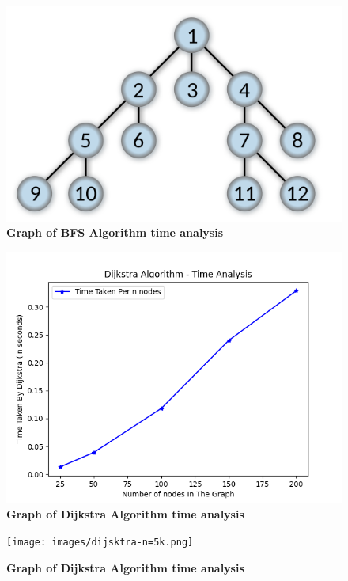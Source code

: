 \documentclass[a4paper, 12pt]{report}
\begin{document}
    
    \begin{figure}
          \centering
          \includegraphics[width=12cm]{images/BFS.png}
          \caption{\textbf{Graph of BFS Algorithm time analysis}}   
          \label{fig:picture1}
    \end{figure} 
    \begin{figure}
          \centering
          \includegraphics[width=12cm]{images/dijkstra2.png}
          \caption{\textbf{Graph of Dijkstra Algorithm time analysis}}   
          \label{fig:picture2}
    \end{figure} 
    \begin{figure}
          \centering
          \texttt{[image: images/dijsktra-n=5k.png]}
          \caption{\textbf{Graph of Dijkstra Algorithm time analysis}}   
          \label{fig:picture3}
    \end{figure} 
    
\end{document}
